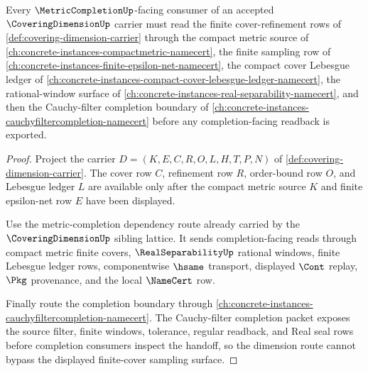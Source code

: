 \begin{theorem}
\label{thm:coveringdimension-cauchy-filter-completion-route}
Every $\MetricCompletionUp$-facing consumer of an accepted $\CoveringDimensionUp$ carrier must read the finite cover-refinement rows of \autoref{def:covering-dimension-carrier} through the compact metric source of \autoref{ch:concrete-instances-compactmetric-namecert}, the finite sampling row of \autoref{ch:concrete-instances-finite-epsilon-net-namecert}, the compact cover Lebesgue ledger of \autoref{ch:concrete-instances-compact-cover-lebesgue-ledger-namecert}, the rational-window surface of \autoref{ch:concrete-instances-real-separability-namecert}, and then the Cauchy-filter completion boundary of \autoref{ch:concrete-instances-cauchyfiltercompletion-namecert} before any completion-facing readback is exported.
\end{theorem}
\begin{proof}
Project the carrier $D=(K,E,C,R,O,L,H,T,P,N)$ of \autoref{def:covering-dimension-carrier}. The cover row $C$, refinement row $R$, order-bound row $O$, and Lebesgue ledger $L$ are available only after the compact metric source $K$ and finite epsilon-net row $E$ have been displayed.

Use the metric-completion dependency route already carried by the $\CoveringDimensionUp$ sibling lattice. It sends completion-facing reads through compact metric finite covers, $\RealSeparabilityUp$ rational windows, finite Lebesgue ledger rows, componentwise $\hsame$ transport, displayed $\Cont$ replay, $\Pkg$ provenance, and the local $\NameCert$ row.

Finally route the completion boundary through \autoref{ch:concrete-instances-cauchyfiltercompletion-namecert}. The Cauchy-filter completion packet exposes the source filter, finite windows, tolerance, regular readback, and Real seal rows before completion consumers inspect the handoff, so the dimension route cannot bypass the displayed finite-cover sampling surface.
\end{proof}

